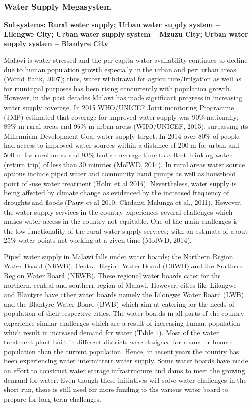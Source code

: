 \documentclass[
]{book}
\begin{document}
\hypertarget{water-supply-megasystem}{%
\subsubsection{Water Supply Megasystem}\label{water-supply-megasystem}}

\textbf{Subsystems: Rural water supply; Urban water supply system -- Lilongwe City; Urban water supply system -- Mzuzu City; Urban water supply system -- Blantyre City}

Malawi is water stressed and the per capita water availability continues to decline due to human population growth especially in the urban and peri urban areas\\
(World Bank, 2007); thus, water withdrawal for agriculture/irrigation as well as for municipal purposes has been rising concurrently with population growth.
However, in the past decades Malawi has made significant progress in increasing water supply coverage. In 2015 WHO/UNICEF Joint monitoring Programme (JMP)
estimated that coverage for improved water supply was 90\% nationally; 89\% in rural areas and 96\% in urban areas (WHO/UNICEF, 2015), surpassing its Millennium
Development Goal water supply target. In 2014 over 80\% of people had access to improved water sources within a distance of 200 m for urban and 500 m for rural
areas and 93\% had an average time to collect drinking water (return trip) of less than 30 minutes (MoIWD, 2014). In rural areas water source options include
piped water and community hand pumps as well as household point of -use water treatment (Holm et al 2016). Nevertheless, water supply is being affected by
climate change as evidenced by the increased frequency of droughts and floods (Pauw et al 2010; Chidanti-Malunga et al., 2011). However, the water supply
services in the country experiences several challenges which makes water access in the country not equitable. One of the main challenges is the low functionality
of the rural water supply services; with an estimate of about 25\% water points not working at a given time (MoIWD, 2014).

Piped water supply in Malawi falls under water boards; the Northern Region Water Board (NRWB), Central Region Water Board (CRWB) and the Northern Region Water
Board (NRWB). These regional water boards cater for the northern, central and southern region of Malawi. However, cities like Lilongwe and Blantyre have other
water boards namely the Lilongwe Water Board (LWB) and the Blantyre Water Board (BWB) which aim at catering for the needs of population of their respective
cities. The water boards in all parts of the country experience similar challenges which are a result of increasing human population which result in increased
demand for water (Table 1). Most of the water treatment plant built in different districts were designed for a smaller human population than the current
population. Hence, in recent years the country has been experiencing water intermittent water supply. Some water boards have made an effort to construct water
storage infrastructure and dams to meet the growing demand for water. Even though these initiatives will solve water challenges in the short run, there is still
need for more funding to the various water board to prepare for long term challenges.
\end{document}
